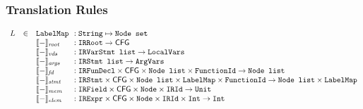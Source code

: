\subsubsection{Translation Rules}
\[
\begin{array}{rll@{~~}l}
L&\in&\TT{LabelMap} &: \TT{String} \mapsto\Nodeset \\
&&\transfun{-}_{\emph{root}} &: \TT{IRRoot} \rightarrow  \CFG \\
&&\transfun{-}_{\emph{vds}} &: \TT{IRVarStmt list} \rightarrow \LocalVars \\
&&\transfun{-}_{\emph{args}} &: \TT{IRStmt list} \rightarrow \ArgVars \\
&&\transfun{-}_{\emph{fd}} &: \TT{IRFunDecl} \times \CFG \times\Nodelist  \times \FunctionId\rightarrow\Nodelist \\
&&\transfun{-}_{\emph{stmt}} &: \TT{IRStmt} \times \CFG \times\Nodelist \times \TT{LabelMap} \times \FunctionId \rightarrow\Nodelist \times \TT{LabelMap}\\
&&\transfun{-}_{\emph{mem}} &: \TT{IRField} \times \CFG \times\Node \times \TT{IRId} \rightarrow \Unit \\
&&\transfun{-}_{\emph{elem}} &: \TT{IRExpr} \times \CFG \times\Node \times \TT{IRId} \times \TT{Int} \rightarrow \tt{Int} \\

\end{array}
\]


